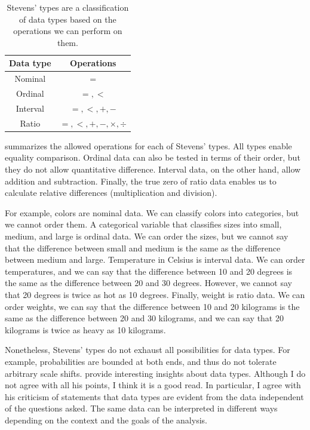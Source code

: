 \begin{table}
  \centering
  \begin{tabular}{cc}
    \toprule
    \textbf{Data type} & \textbf{Operations} \\
    \midrule
    Nominal & $=$ \\
    Ordinal & $=, <$ \\
    Interval & $=, <, +, - $ \\
    Ratio & $=, <, +, -, \times, \div$ \\
    \bottomrule
  \end{tabular}
  \caption{
  Stevens' types are a classification of data types based on the operations we can perform
  on them.
  }
  \label{tab:stevens}
\end{table}

 summarizes the allowed operations for each of Stevens' types.  All types
enable equality comparison.  Ordinal data can also be tested in terms of their order, but
they do not allow quantitative difference.  Interval data, on the other hand, allow
addition and subtraction.  Finally, the true zero of ratio data enables us to calculate
relative differences (multiplication and division).

For example, colors are nominal data.  We can classify colors into categories, but we cannot
order them.  A categorical variable that classifies sizes into small, medium, and large is
ordinal data.  We can order the sizes, but we cannot say that the difference between small
and medium is the same as the difference between medium and large.  Temperature in Celsius
is interval data.  We can order temperatures, and we can say that the difference between
10 and 20 degrees is the same as the difference between 20 and 30 degrees.  However, we
cannot say that 20 degrees is twice as hot as 10 degrees.  Finally, weight is ratio data.
We can order weights, we can say that the difference between 10 and 20 kilograms is the
same as the difference between 20 and 30 kilograms, and we can say that 20 kilograms is
twice as heavy as 10 kilograms.

Nonetheless, Stevens' types do not exhaust all possibilities for data types.  For example,
probabilities are bounded at both ends, and thus do not tolerate arbitrary scale shifts.
\textcite{Paul1993} provide interesting insights about data types.  Although I do not
agree with all his points, I think it is a good read.  In particular, I agree with
his criticism of statements that data types are evident from the data independent of the
questions asked.  The same data can be interpreted in different ways depending on the
context and the goals of the analysis.


